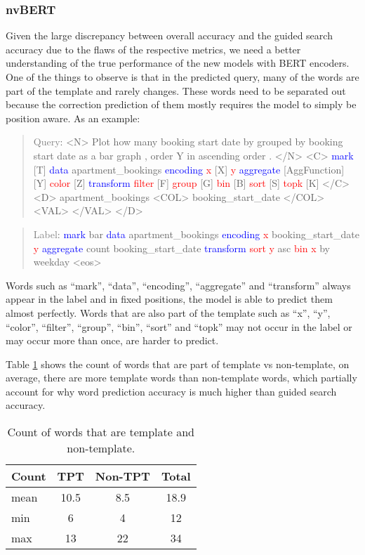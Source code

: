 \documentclass[
	a4paper, %
	10pt, %
	unnumberedsections, %
	twoside, %
]{t0003}
\newcommand{\blue}[1]{\textcolor{blue}{#1}}
\newcommand{\gray}[1]{\textcolor{gray}{#1}}
\newcommand{\red}[1]{\textcolor{red}{#1}}
\begin{document}
\subsubsection{nvBERT} Given the large discrepancy between overall accuracy and the guided search accuracy due to the flaws of the respective metrics, we need a better understanding of the true performance of the new models with BERT encoders. One of the things to observe is that in the predicted query, many of the words are part of the template and rarely changes. These words need to be separated out because the correction prediction of them mostly requires the model to simply be position aware. As an example:

\begin{quote}
\gray{Query}: <N> Plot how many booking start date by grouped by booking start date as a bar graph , order Y in ascending order . </N> <C> \blue{mark} [T] \blue{data} apartment\_bookings \blue{ encoding} \red{x} [X] \red{y} \blue{aggregate} [AggFunction] [Y] \red{color} [Z] \blue{transform} \red{filter} [F] \red{group} [G] \red{bin} [B] \red{sort} [S] \red{topk} [K] </C> <D> apartment\_bookings <COL> booking\_start\_date </COL> <VAL> </VAL> </D>
\end{quote}

\begin{quote}
\gray{Label}: \blue{mark} bar \blue{data} apartment\_bookings \blue{encoding} \red{x} booking\_start\_date \red{y} \blue{aggregate} count booking\_start\_date \blue{transform} \red{sort} \red{y} asc \red{bin} \red{x} by weekday <eos>
\end{quote}

Words such as ``mark'', ``data'', ``encoding'', ``aggregate'' and ``transform'' always appear in the label and in fixed positions, the model is able to predict them almost perfectly. Words that are also part of the template such as ``x'', ``y'', ``color'', ``filter'', ``group'', ``bin'', ``sort'' and ``topk'' may not occur in the label or may occur more than once, are harder to predict.

Table \ref{tab:count} shows the count of words that are part of template vs non-template, on average, there are more template words than non-template words, which partially account for why word prediction accuracy is much higher than guided search accuracy.

\begin{table}
	\caption{Count of words that are template and non-template.}
	\centering
	\begin{tabular}{ lccc }
		\toprule
		Count & TPT & Non-TPT & Total  \\
		\midrule
		mean & 10.5 & 8.5 & 18.9 \\
                  min & 6 & 4 & 12 \\
                  max & 13 & 22 & 34 \\
		\bottomrule
	\end{tabular}
	\label{tab:count}
\end{table}
\end{document}
